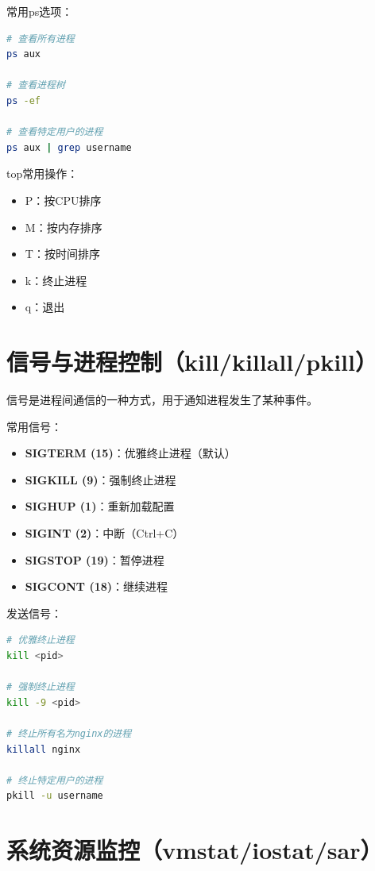 \documentclass[12pt,UTF8]{ctexbook}
\begin{document}
常用ps选项：
\begin{lstlisting}[language=bash]
# 查看所有进程
ps aux

# 查看进程树
ps -ef

# 查看特定用户的进程
ps aux | grep username
\end{lstlisting}

top常用操作：
\begin{itemize}
    \item P：按CPU排序
    \item M：按内存排序
    \item T：按时间排序
    \item k：终止进程
    \item q：退出
\end{itemize}

\section{信号与进程控制（kill/killall/pkill）}
\label{sec:process-signals}

信号是进程间通信的一种方式，用于通知进程发生了某种事件。

常用信号：
\begin{itemize}
    \item \textbf{SIGTERM (15)}：优雅终止进程（默认）
    \item \textbf{SIGKILL (9)}：强制终止进程
    \item \textbf{SIGHUP (1)}：重新加载配置
    \item \textbf{SIGINT (2)}：中断（Ctrl+C）
    \item \textbf{SIGSTOP (19)}：暂停进程
    \item \textbf{SIGCONT (18)}：继续进程
\end{itemize}

发送信号：
\begin{lstlisting}[language=bash]
# 优雅终止进程
kill <pid>

# 强制终止进程
kill -9 <pid>

# 终止所有名为nginx的进程
killall nginx

# 终止特定用户的进程
pkill -u username
\end{lstlisting}

\section{系统资源监控（vmstat/iostat/sar）}
\label{sec:resource-monitor}
\end{document}
